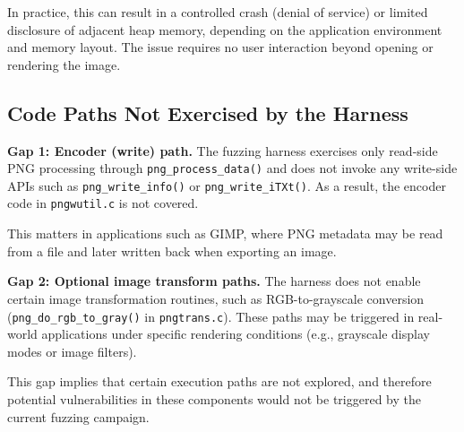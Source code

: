 In practice, this can result in a controlled crash (denial of
service) or limited disclosure of adjacent heap memory, depending on
the application environment and memory layout. The issue requires no user interaction
beyond opening or rendering the image.

\subsection{Code Paths Not Exercised by the Harness}

\textbf{Gap 1: Encoder (write) path.}
The fuzzing harness exercises only read-side PNG processing through
\texttt{png\_process\_data()} and does not invoke any write-side APIs
such as \texttt{png\_write\_info()} or \texttt{png\_write\_iTXt()}.
As a result, the encoder code in \texttt{pngwutil.c} is not covered.

This matters in applications such as GIMP, where PNG metadata may be
read from a file and later written back when exporting an image.

\textbf{Gap 2: Optional image transform paths.}
The harness does not enable certain image transformation routines,
such as RGB-to-grayscale conversion (\texttt{png\_do\_rgb\_to\_gray()}
in \texttt{pngtrans.c}). These paths may be triggered in real-world
applications under specific rendering conditions (e.g., grayscale
display modes or image filters).

This gap implies that certain execution paths are not explored, and
therefore potential vulnerabilities in these components would not be
triggered by the current fuzzing campaign.